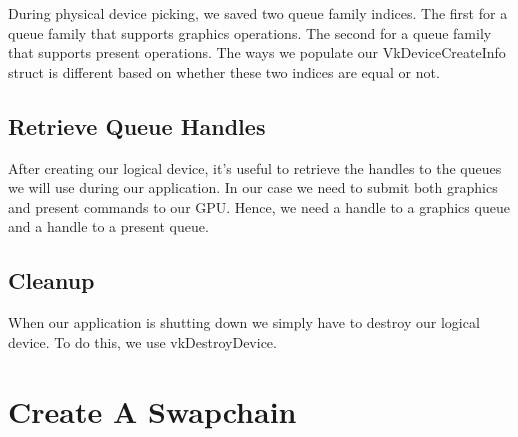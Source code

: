 During physical device picking, we saved two queue family indices.
The first for a queue family that supports graphics operations.
The second for a queue family that supports present operations.
The ways we populate our VkDeviceCreateInfo struct is different based on whether
these two indices are equal or not.

\begin{minipage}{\linewidth}{\noindent}
    
\end{minipage}

\begin{minipage}{\linewidth}{\noindent}
    
\end{minipage}

\subsection{Retrieve Queue Handles}

After creating our logical device, it's useful to retrieve the handles to the
queues we will use during our application.
In our case we need to submit both graphics and present commands to our GPU.
Hence, we need a handle to a graphics queue and a handle to a present queue.

\begin{minipage}{\linewidth}{\noindent}
    
\end{minipage}

\subsection{Cleanup}

When our application is shutting down we simply have to destroy our logical
device.
To do this, we use vkDestroyDevice.

\section{Create A Swapchain}

